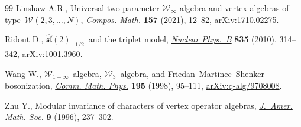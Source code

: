 \documentclass[pdftex]{sigma}
\numberwithin{equation}{section}
\begin{document}
\begin{thebibliography}{99}
Linshaw A.R., Universal two-parameter {$\mathcal W_\infty$}-algebra and vertex
 algebras of type~{$\mathcal W(2, 3, \ldots, N)$},
 \href{https://doi.org/10.1112/s0010437x20007514}{\textit{Compos. Math.}}
 \textbf{157} (2021), 12--82,
 \href{http://arxiv.org/abs/1710.02275}{arXiv:1710.02275}.

Ridout D., {$\widehat{\mathfrak{sl}}(2)_{-1/2}$}~and the triplet model,
 \href{https://doi.org/10.1016/j.nuclphysb.2010.03.018}{\textit{Nuclear
 Phys.~B}} \textbf{835} (2010), 314--342,
 \href{http://arxiv.org/abs/1001.3960}{arXiv:1001.3960}.

Wang W., {$\mathcal W_{1+\infty}$}~algebra, {$\mathcal W_3$}~algebra, and
 {F}riedan--{M}artinec--{S}henker bosonization,
 \href{https://doi.org/10.1007/s002200050381}{\textit{Comm. Math. Phys.}}
 \textbf{195} (1998), 95--111,
 \href{http://arxiv.org/abs/q-alg/9708008}{arXiv:q-alg/9708008}.

Zhu Y., Modular invariance of characters of vertex operator algebras,
 \href{https://doi.org/10.1090/S0894-0347-96-00182-8}{\textit{J.~Amer. Math.
 Soc.}} \textbf{9} (1996), 237--302.

\end{thebibliography}\LastPageEnding
\end{document}
